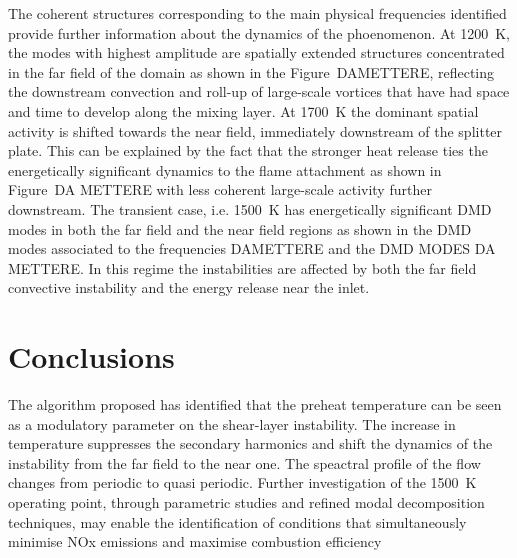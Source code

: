 The coherent structures corresponding to the main physical frequencies identified provide further information about the dynamics of the phoenomenon. At 1200~K, the modes with highest amplitude are spatially extended structures concentrated in the far field of the domain as shown in the Figure~DAMETTERE, reflecting the downstream convection and roll-up of large-scale vortices that have had space and time to develop along the mixing layer. At 1700~K the dominant spatial activity is shifted towards the near field, immediately downstream of the splitter plate. This can be explained by the fact that the stronger heat release ties the energetically significant dynamics to the flame attachment as shown in Figure~DA METTERE with less coherent large-scale activity further downstream. 
The transient case, i.e. 1500~K has energetically significant DMD modes in both the far field and the near field regions as shown in the DMD modes associated to the frequencies DAMETTERE and the DMD MODES DA METTERE. In this regime the instabilities are affected by both the far field convective instability and the energy release near the inlet.

\section{Conclusions}

The algorithm proposed has identified that the preheat temperature can be seen as a modulatory parameter on the shear-layer instability. The increase in temperature suppresses the secondary harmonics and shift the dynamics of the instability from the far field to the near one. The speactral profile of the flow changes from periodic to quasi periodic. 
Further investigation of the 1500~K operating point, through parametric studies and refined modal decomposition techniques, may enable the identification of conditions that simultaneously minimise NOx emissions and maximise combustion efficiency

